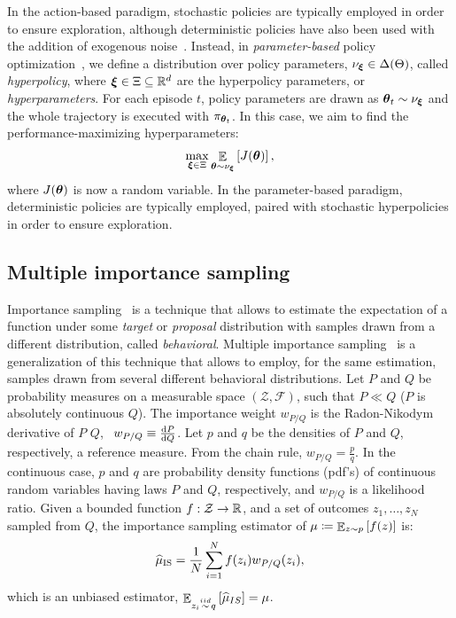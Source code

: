\documentclass{article}
\begin{document}
In the action-based paradigm, stochastic policies are typically employed in order to ensure exploration, although deterministic policies have also been used with the addition of exogenous noise~\citep{silver2014deterministic}.
Instead, in \textit{parameter-based} policy optimization~\citep{sehnke2008policy}, we define a distribution over policy parameters, $\nu_{\boldsymbol{\xi}}\in\Delta(\Theta)$, called \textit{hyperpolicy}, where $\boldsymbol{\xi}\in\Xi\subseteq\mathbb{R}^d$ are the hyperpolicy parameters, or \textit{hyperparameters}. For each episode $t$, policy parameters are drawn as $\boldsymbol{\theta}_t\sim\nu_{\boldsymbol{\xi}}$ and the whole trajectory is executed with $\pi_{\boldsymbol{\theta}_t}$. In this case, we aim to find the performance-maximizing hyperparameters:
\begin{align}\label{eq:Jx}
	\max_{\boldsymbol{\xi}\in\Xi} \mathop{\mathbb{E}}_{\boldsymbol{\theta}\sim\nu_{\boldsymbol{\xi}}}\left[J(\boldsymbol{\theta})\right],
\end{align}
where $J(\boldsymbol{\theta})$ is now a random variable.
In the parameter-based paradigm, deterministic policies are typically employed, paired with stochastic hyperpolicies in order to ensure exploration.

\subsection{Multiple importance sampling}
Importance sampling~\citep{cochran2007sampling,mcbook} is a technique that allows to estimate the expectation of a function under some \textit{target} or \textit{proposal} distribution with samples drawn from a different distribution, called \textit{behavioral}. Multiple importance sampling~\citep{veach_optimally_1995} is a generalization of this technique that allows to employ, for the same estimation, samples drawn from several different behavioral distributions. Let $P$ and $Q$ be probability measures on a measurable space $(\mathcal{Z}, \mathcal{F})$, such that $P\ll Q$ (\ie $P$ is absolutely continuous \wrt $Q$). The importance weight $w_{P/Q}$ is the Radon-Nikodym derivative of $P$ \wrt $Q$, \ie~$w_{P/Q} \equiv \frac{\mathrm{d} P}{\mathrm{d} Q}$. Let $p$ and $q$ be the densities of $P$ and $Q$, respectively, \wrt a reference measure. From the chain rule, $w_{P/Q} = \frac{p}{q}$. In the continuous case, $p$ and $q$ are probability density functions (pdf's) of continuous random variables having laws $P$ and $Q$, respectively, and $w_{P/Q}$ is a likelihood ratio. 
Given a bounded function $f:\mathcal{Z}\to\mathbb{R}$, and a set of \iid outcomes $z_1,\dots,z_N$ sampled from $Q$, the importance sampling estimator of $\mu\coloneqq\mathop{\mathbb{E}}_{z\sim p}\left[f(z)\right]$ is:
\begin{align}\label{eq:ise}
	\widehat{\mu}_{\text{IS}} = \frac{1}{N}\sum_{i=1}^{N}f(z_i)w_{P/Q}(z_i),
\end{align}
which is an unbiased estimator, \ie ${\mathop{\mathbb{E}}_{z_i\stackrel{iid}{\sim} q}\left[\widehat{\mu}_{IS}\right] = \mu}$. 
\end{document}
